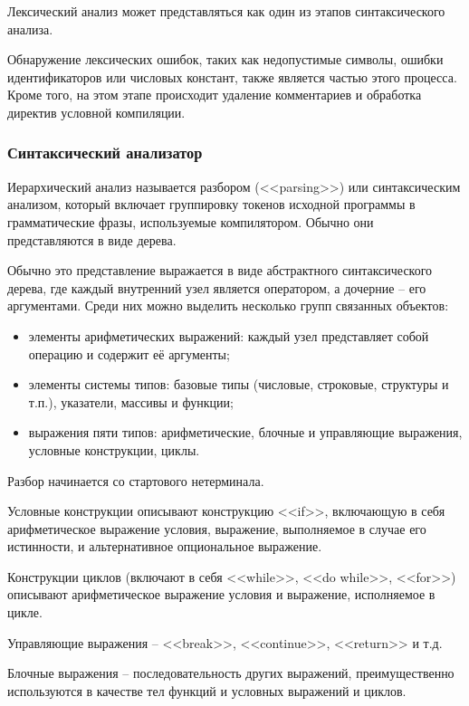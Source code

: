 Лексический анализ может представляться как один из этапов синтаксического анализа. 

Обнаружение лексических ошибок, таких как недопустимые символы, ошибки идентификаторов или числовых констант, также является частью этого процесса. Кроме того, на этом этапе происходит удаление комментариев и обработка директив условной компиляции. \\

\subsubsection{Синтаксический анализатор}
Иерархический анализ называется разбором (<<parsing>>) или синтаксическим анализом, который включает группировку токенов исходной программы в грамматические фразы, используемые компилятором. Обычно они представляются в виде дерева. 

Обычно это представление выражается в виде абстрактного синтаксического дерева, где каждый внутренний узел является оператором, а дочерние -- его аргументами. Среди них можно выделить несколько групп связанных объектов:
\begin{itemize}
	\item элементы арифметических выражений: каждый узел представляет собой операцию и содержит её аргументы;
	
	\item элементы системы типов: базовые типы (числовые, строковые, структуры и т.п.), указатели, массивы и функции;
	 
	\item выражения пяти типов: арифметические, блочные и управляющие выражения, условные конструкции, циклы.
\end{itemize}

Разбор начинается со стартового нетерминала. 

Условные конструкции описывают конструкцию <<if>>, включающую в себя арифметическое выражение условия, выражение, выполняемое в случае его истинности, и альтернативное опциональное выражение.

Конструкции циклов (включают в себя <<while>>, <<do while>>, <<for>>) описывают арифметическое выражение условия и выражение, исполняемое в цикле.

Управляющие выражения -- <<break>>, <<continue>>, <<return>> и т.д. 

Блочные выражения -- последовательность других выражений, преимущественно используются в качестве тел функций и условных выражений и циклов.

